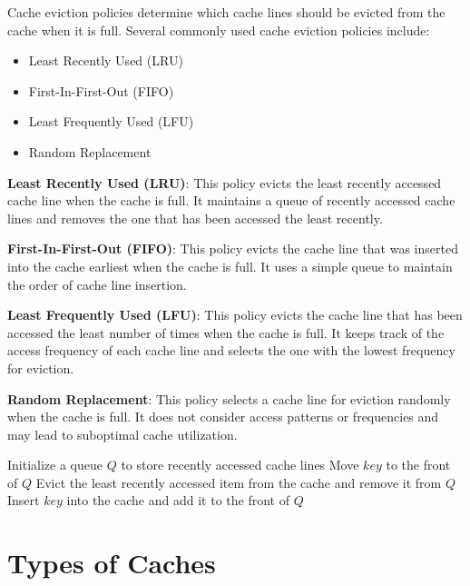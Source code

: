 \documentclass[12pt]{book} %
\begin{document}
Cache eviction policies determine which cache lines should be evicted from the cache when it is full. Several commonly used cache eviction policies include:

\begin{itemize}
    \item Least Recently Used (LRU)
    \item First-In-First-Out (FIFO)
    \item Least Frequently Used (LFU)
    \item Random Replacement
\end{itemize}

\textbf{Least Recently Used (LRU)}: This policy evicts the least recently accessed cache line when the cache is full. It maintains a queue of recently accessed cache lines and removes the one that has been accessed the least recently.

\textbf{First-In-First-Out (FIFO)}: This policy evicts the cache line that was inserted into the cache earliest when the cache is full. It uses a simple queue to maintain the order of cache line insertion.

\textbf{Least Frequently Used (LFU)}: This policy evicts the cache line that has been accessed the least number of times when the cache is full. It keeps track of the access frequency of each cache line and selects the one with the lowest frequency for eviction.

\textbf{Random Replacement}: This policy selects a cache line for eviction randomly when the cache is full. It does not consider access patterns or frequencies and may lead to suboptimal cache utilization.

\FloatBarrier
\begin{algorithm}[h]
\caption{Least Recently Used (LRU) Cache Eviction Policy}
\begin{algorithmic}[1]
\State Initialize a queue $Q$ to store recently accessed cache lines
\State Move $key$ to the front of $Q$
\Else
\State Evict the least recently accessed item from the cache and remove it from $Q$
\State Insert $key$ into the cache and add it to the front of $Q$
\EndIf
\EndProcedure
\end{algorithmic}
\end{algorithm}
\FloatBarrier

\section{Types of Caches}
\end{document}
